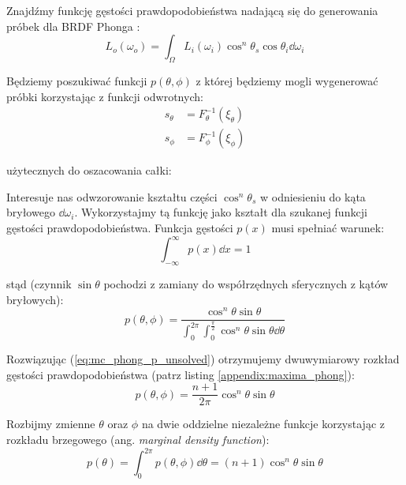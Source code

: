 \documentclass[../main.tex]{subfiles}
\begin{document}
Znajdźmy funkcję gęstości prawdopodobieństwa nadającą się do generowania próbek dla BRDF Phonga \cite{NotesImportanceSampling,ImportanceSamplingForProduction}:
\begin{equation}
  L_o(\omega_o) = \int_{\Omega} {
    L_i(\omega_i) \cos^{n}\theta_s \cos\theta_i \dd \omega_i
  }
\end{equation}

Będziemy poszukiwać funkcji $p(\theta, \phi)$ z której będziemy mogli wygenerować próbki korzystając z funkcji odwrotnych:
\begin{equation}\begin{aligned}
  s_\theta &= F_{\theta}^{-1}(\xi_\theta) \\
  s_\phi &= F_{\phi}^{-1}(\xi_\phi)
\end{aligned}\end{equation}

\noindent użytecznych do oszacowania całki:

Interesuje nas odwzorowanie kształtu części $\cos^{n}\theta_s$ w odniesieniu do kąta bryłowego $\dd \omega_i$. Wykorzystajmy tą funkcję jako kształt dla szukanej funkcji gęstości prawdopodobieństwa. Funkcja gęstości $p(x)$ musi spełniać warunek:
\begin{equation}
\int_{-\infty}^{\infty} p(x) \dd x = 1 
\end{equation}

\noindent stąd (czynnik $\sin\theta$ pochodzi z zamiany do współrzędnych sferycznych z kątów bryłowych):
\begin{equation}
  p(\theta, \phi) = \frac{
    \cos^{n}{\theta} \sin\theta
  }{
    \int_{0}^{2\pi} \int_{0}^{\frac{\pi}{2}} {
      \cos^{n}{\theta} \sin\theta \dd \theta
    }
  }
\label{eq:mc_phong_p_unsolved}
\end{equation}

Rozwiązując (\ref{eq:mc_phong_p_unsolved}) otrzymujemy dwuwymiarowy rozkład gęstości prawdopodobieństwa (patrz listing \ref{appendix:maxima_phong}):
\begin{equation}
  p(\theta, \phi) =
    \frac{n+1}{2\pi} \cos^{n}\theta \sin\theta
\end{equation}

Rozbijmy zmienne $\theta$ oraz $\phi$ na dwie oddzielne niezależne funkcje korzystając z rozkładu brzegowego (ang. \textit{marginal density function}):
\begin{equation}
  p(\theta) = \int_{0}^{2\pi} {
    p(\theta, \phi) \dd \theta
  } =
  (n+1) \cos^{n}{\theta} \sin\theta
\end{equation}
\end{document}
